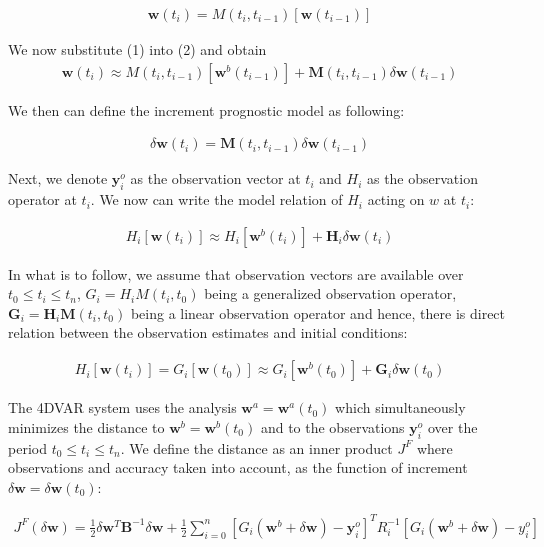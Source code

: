 \documentclass[a4,12pt]{article}
\begin{document}
\begin{align}
\mathbf {w}(t_{i})=M(t_{i},t_{i-1})[\mathbf {w}(t_{i-1})]
\end{align}

We now substitute (1) into (2) and obtain 
\begin{align}
\mathbf {w}(t_{i}) \approx M(t_{i},t_{i-1})[\mathbf {w}^{b}(t_{i-1})] + \mathbf {M}(t_{i},t_{i-1})\delta \mathbf {w}(t_{i-1})
\end{align}

We then can define the increment prognostic model as following:

\begin{align}
\delta \mathbf {w}(t_{i}) = \mathbf {M}(t_{i},t_{i-1})\delta \mathbf {w}(t_{i-1})
\end{align}

Next, we denote $\mathbf {y}_{i}^{o}$ as the observation vector at $t_{i}$ and $H_{i}$ as the observation operator at $t_{i}$. We now can write the model relation of $H_{i}$ acting on $w$ at $t_{i}$:

\begin{align}
H_{i}[\mathbf {w}(t_{i})] \approx H_{i}[\mathbf {w}^{b}(t_{i})]+\mathbf {H}_{i}\delta \mathbf {w}(t_{i})
\end{align}

In what is to follow, we assume that observation vectors are available over $t_{0}\leq t_{i} \leq t_{n}$, $G_{i} = H_{i}M(t_{i},t_{0})$ being a generalized observation operator, $\mathbf {G}_{i} = \mathbf {H}_{i}\mathbf {M}(t_{i},t_{0})$ being a linear observation operator and hence, there is direct relation between the observation estimates and initial conditions:

\begin{align}
H_{i}[\mathbf {w}(t_{i})]=G_{i}[\mathbf {w}(t_{0})] \approx G_{i}[\mathbf {w}^{b}(t_{0})] + \mathbf {G}_{i}\delta \mathbf {w}(t_{0})
\end{align}

The 4DVAR system uses the analysis $\mathbf {w}^{a}=\mathbf {w}^{a}(t_{0})$ which simultaneously minimizes the distance to $\mathbf {w}^{b} = \mathbf {w}^{b}(t_{0})$ and to the observations $\mathbf {y}_{i}^{o}$ over the period $t_{0}\leq t_{i} \leq t_{n}$. We define the distance as an inner product $J^{F}$ where observations and accuracy taken into account, as the function of increment $\delta \mathbf {w} = \delta \mathbf {w}(t_{0})$:

\begin{align}
J^{F}(\delta \mathbf {w}) = \frac{1}{2} \delta \mathbf {w}^{T} \mathbf {B}^{-1} \delta \mathbf {w} + \frac{1}{2} \sum_{i=0}^{n}[G_{i}(\mathbf {w}^{b}+\delta \mathbf {w})-\mathbf {y}_{i}^{o}]^{T}R_{i}^{-1}[G_{i}(\mathbf {w}^{b} + \delta \mathbf {w}) - y_{i}^{o}]
\end{align}
\end{document}
